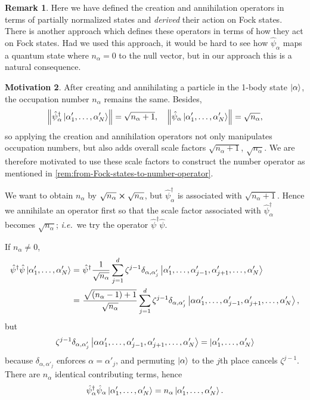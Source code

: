 \documentclass{article}
\theoremstyle{definition}
\newtheorem{mot}{Motivation}[section]
\newtheorem{rem}[mot]{Remark}
\numberwithin{equation}{section}
\begin{document}
\begin{rem}
    Here we have defined 
    the creation and annihilation operators 
    in terms of partially normalized states 
    and \emph{derived} their action 
    on Fock states. There is another approach
    \cite[][\S\ 2.1]{altland_condensed_2023}
    which 
    defines these operators in terms of 
    how they act on Fock states. 
    Had we used this approach, 
    it would be hard to see how 
    $\hat{\psi}_{\alpha}$ maps 
    a quantum state where $n_{\alpha}=0$ 
    to the null vector, 
    but in our approach this is a 
    natural consequence.
\end{rem}

\begin{mot}
    After creating and annihilating 
    a particle in the 1-body state $\ket{\alpha}$, 
    the occupation number $n_{\alpha}$ 
    remains the same. Besides, 
    \[
        \norm{
        \hat{\psi}^{\dagger}_{\alpha}
        \ket{\alpha'_{1}, \ldots ,\alpha'_{N}}
        }
        =
        \sqrt{n_{\alpha}+1},\quad
        \norm{
        \hat{\psi}_{\alpha}
        \ket{\alpha'_{1}, \ldots ,\alpha'_{N}}
        }
        =
        \sqrt{n_{\alpha}},
    \]
    so applying the creation and annihilation 
    operators 
    not only manipulates occupation numbers, 
    but also adds overall scale factors 
    $\sqrt{n_{\alpha}+1}$, $\sqrt{n_{\alpha}}$. 
    We are therefore motivated 
    to use these scale factors 
    to construct the number operator 
    as mentioned in \cref{rem:from-Fock-states-to-number-operator}.
\end{mot}

We want to obtain $n_{\alpha}$ by 
$\sqrt{n_{\alpha}}\cross \sqrt{n_{\alpha}}$, 
but $\hat{\psi}^{\dagger}_{\alpha}$ 
is associated with $\sqrt{n_{\alpha}+1}$. 
Hence we annihilate an operator first so that 
the scale factor associated with $\hat{\psi}^{\dagger}_{\alpha}$ 
becomes $\sqrt{n_{\alpha}}$; \textit{i.e.}\ we try 
the operator $\hat{\psi}^{\dagger}\hat{\psi}$.

If $n_{\alpha}\neq 0$, 
\begin{align*}
    \hat{\psi}^{\dagger}\hat{\psi}
    \ket{\alpha'_{1}, \ldots ,\alpha'_{N}}
    =&\ 
    \hat{\psi}^{\dagger}
    \frac{1}{\sqrt{n_{\alpha}}}
    \sum_{j=1}^{d}
    \zeta^{j-1}\delta_{\alpha,\alpha'_{j}}
    \ket{\alpha'_{1}, \ldots ,\alpha'_{j-1},
    \alpha'_{j+1}, \ldots ,\alpha'_{N}} \\
    =&\ 
    \frac{\sqrt{(n_{\alpha}-1)+1}}{\sqrt{n_{\alpha}}}
    \sum_{j=1}^{d}
    \zeta^{j-1}\delta_{\alpha,\alpha'_{j}}
    \ket{\alpha \alpha'_{1}, \ldots ,\alpha'_{j-1},
    \alpha'_{j+1}, \ldots ,\alpha'_{N}},
\end{align*}
but 
\[
    \zeta^{j-1}\delta_{\alpha,\alpha'_{j}}
    \ket{\alpha \alpha'_{1}, \ldots ,\alpha'_{j-1},
    \alpha'_{j+1}, \ldots ,\alpha'_{N}}
    =
    \ket{\alpha'_{1}, \ldots ,\alpha'_{N}}
\]
because $\delta_{\alpha,\alpha'_{j}}$ 
enforces 
$\alpha=\alpha'_{j}$, 
and permuting $\ket{\alpha}$ to the $j$th place 
cancels $\zeta^{j-1}$. 
There are $n_{\alpha}$ identical contributing terms, hence
\[
    \hat{\psi}^{\dagger}_{\alpha}\hat{\psi}_{\alpha}
    \ket{\alpha'_{1}, \ldots ,\alpha'_{N}}
    =
    n_{\alpha}
    \ket{\alpha'_{1}, \ldots ,\alpha'_{N}}.
\]
\end{document}
